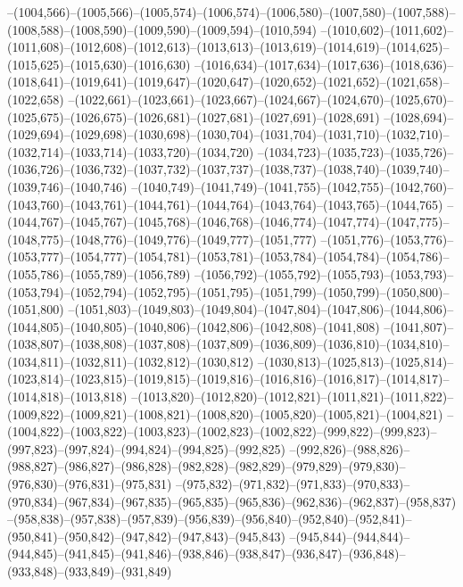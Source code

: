 --(1004,566)--(1005,566)--(1005,574)--(1006,574)--(1006,580)--(1007,580)--(1007,588)--(1008,588)--(1008,590)--(1009,590)--(1009,594)--(1010,594)
--(1010,602)--(1011,602)--(1011,608)--(1012,608)--(1012,613)--(1013,613)--(1013,619)--(1014,619)--(1014,625)--(1015,625)--(1015,630)--(1016,630)
--(1016,634)--(1017,634)--(1017,636)--(1018,636)--(1018,641)--(1019,641)--(1019,647)--(1020,647)--(1020,652)--(1021,652)--(1021,658)--(1022,658)
--(1022,661)--(1023,661)--(1023,667)--(1024,667)--(1024,670)--(1025,670)--(1025,675)--(1026,675)--(1026,681)--(1027,681)--(1027,691)--(1028,691)
--(1028,694)--(1029,694)--(1029,698)--(1030,698)--(1030,704)--(1031,704)--(1031,710)--(1032,710)--(1032,714)--(1033,714)--(1033,720)--(1034,720)
--(1034,723)--(1035,723)--(1035,726)--(1036,726)--(1036,732)--(1037,732)--(1037,737)--(1038,737)--(1038,740)--(1039,740)--(1039,746)--(1040,746)
--(1040,749)--(1041,749)--(1041,755)--(1042,755)--(1042,760)--(1043,760)--(1043,761)--(1044,761)--(1044,764)--(1043,764)--(1043,765)--(1044,765)
--(1044,767)--(1045,767)--(1045,768)--(1046,768)--(1046,774)--(1047,774)--(1047,775)--(1048,775)--(1048,776)--(1049,776)--(1049,777)--(1051,777)
--(1051,776)--(1053,776)--(1053,777)--(1054,777)--(1054,781)--(1053,781)--(1053,784)--(1054,784)--(1054,786)--(1055,786)--(1055,789)--(1056,789)
--(1056,792)--(1055,792)--(1055,793)--(1053,793)--(1053,794)--(1052,794)--(1052,795)--(1051,795)--(1051,799)--(1050,799)--(1050,800)--(1051,800)
--(1051,803)--(1049,803)--(1049,804)--(1047,804)--(1047,806)--(1044,806)--(1044,805)--(1040,805)--(1040,806)--(1042,806)--(1042,808)--(1041,808)
--(1041,807)--(1038,807)--(1038,808)--(1037,808)--(1037,809)--(1036,809)--(1036,810)--(1034,810)--(1034,811)--(1032,811)--(1032,812)--(1030,812)
--(1030,813)--(1025,813)--(1025,814)--(1023,814)--(1023,815)--(1019,815)--(1019,816)--(1016,816)--(1016,817)--(1014,817)--(1014,818)--(1013,818)
--(1013,820)--(1012,820)--(1012,821)--(1011,821)--(1011,822)--(1009,822)--(1009,821)--(1008,821)--(1008,820)--(1005,820)--(1005,821)--(1004,821)
--(1004,822)--(1003,822)--(1003,823)--(1002,823)--(1002,822)--(999,822)--(999,823)--(997,823)--(997,824)--(994,824)--(994,825)--(992,825)
--(992,826)--(988,826)--(988,827)--(986,827)--(986,828)--(982,828)--(982,829)--(979,829)--(979,830)--(976,830)--(976,831)--(975,831)
--(975,832)--(971,832)--(971,833)--(970,833)--(970,834)--(967,834)--(967,835)--(965,835)--(965,836)--(962,836)--(962,837)--(958,837)
--(958,838)--(957,838)--(957,839)--(956,839)--(956,840)--(952,840)--(952,841)--(950,841)--(950,842)--(947,842)--(947,843)--(945,843)
--(945,844)--(944,844)--(944,845)--(941,845)--(941,846)--(938,846)--(938,847)--(936,847)--(936,848)--(933,848)--(933,849)--(931,849)
